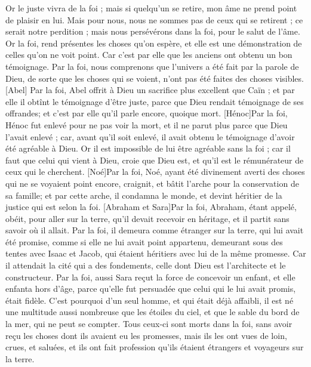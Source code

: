 \begin{multicols}{2}
Or le juste vivra de la foi ; mais si quelqu'un se retire, mon âme ne prend point de plaisir en lui.
Mais pour nous, nous ne sommes pas de ceux qui se retirent ; ce serait notre perdition ; mais nous persévérons dans la foi, pour le salut de l'âme.
\VerseOne{}Or la foi, rend présentes les choses qu'on espère, et elle est une démonstration de celles qu'on ne voit point.
Car c'est par elle que les anciens ont obtenu un bon  témoignage.
Par la foi, nous comprenons que l'univers a été fait par la parole de Dieu, de sorte que les choses qui se voient, n'ont pas été faites des choses visibles.
[Abel] Par la foi, Abel offrit à Dieu un sacrifice plus excellent que Caïn ; et par elle il obtînt le témoignage d'être juste, parce que Dieu rendait témoignage de ses offrandes; et c'est par elle qu'il parle encore, quoique mort.
[Hénoc]Par la foi, Hénoc fut enlevé pour ne pas voir la mort, et il ne parut plus parce que Dieu l'avait enlevé ; car, avant qu'il soit enlevé, il avait obtenu le témoignage d'avoir été agréable à Dieu.
Or il est impossible de lui être agréable sans la foi ; car il faut que celui qui vient à Dieu, croie que Dieu est, et qu'il est le rémunérateur de ceux qui le cherchent.
[Noé]Par la foi, Noé, ayant été divinement averti des choses qui ne se voyaient point encore, craignit, et bâtit l'arche pour la conservation de sa famille; et par cette arche, il condamna le monde, et devint héritier de la justice qui est selon la foi.
[Abraham et Sara]Par la foi, Abraham, étant appelé, obéit, pour aller sur la terre, qu'il devait recevoir en héritage, et il partit sans savoir où il allait.
Par la foi, il demeura comme étranger sur la terre, qui lui avait été promise, comme si elle ne lui avait point appartenu, demeurant sous des tentes avec Isaac et Jacob, qui étaient héritiers avec lui de la même promesse.
Car il attendait la cité qui a des fondements, celle dont Dieu est l'architecte et le constructeur.
Par la foi, aussi Sara reçut la force de concevoir un enfant, et elle enfanta hors d'âge, parce qu'elle fut persuadée que celui qui le lui avait promis, était fidèle.
C'est pourquoi d'un seul homme, et qui était déjà affaibli, il est né une multitude aussi nombreuse que les étoiles du ciel, et que le sable du bord de la mer, qui ne peut se compter.
Tous ceux-ci sont morts dans la foi, sans avoir reçu les choses dont ils avaient eu les promesses, mais ils les ont vues de loin, crues, et saluées, et ils ont fait profession qu'ils étaient étrangers et voyageurs sur la terre.

\end{multicols}
